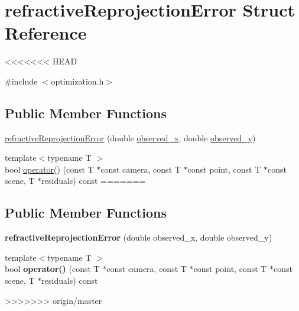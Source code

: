 \hypertarget{structrefractiveReprojectionError}{\section{refractive\-Reprojection\-Error Struct Reference}
\label{d8/d20/structrefractiveReprojectionError}
}
<<<<<<< HEAD


{\ttfamily \#include $<$optimization.\-h$>$}

\subsection*{Public Member Functions}
\begin{DoxyCompactItemize}
\item 
\hyperlink{structrefractiveReprojectionError_a0bd1a52a65545d440518fa718beba32b}{refractive\-Reprojection\-Error} (double \hyperlink{structrefractiveReprojectionError_a7992f6f0be264e8a5f72027ac5897581}{observed\-\_\-x}, double \hyperlink{structrefractiveReprojectionError_aa2f04966bc8045945bee5487a0b6fac7}{observed\-\_\-y})
\item 
{\footnotesize template$<$typename T $>$ }\\bool \hyperlink{structrefractiveReprojectionError_ac25617f3bbdb148e1591a64895c1444c}{operator()} (const T $\ast$const camera, const T $\ast$const point, const T $\ast$const scene, T $\ast$residuals) const 
=======
\subsection*{Public Member Functions}
\begin{DoxyCompactItemize}
\item 
\hypertarget{structrefractiveReprojectionError_a0bd1a52a65545d440518fa718beba32b}{{\bfseries refractive\-Reprojection\-Error} (double observed\-\_\-x, double observed\-\_\-y)}\label{d8/d20/structrefractiveReprojectionError_a0bd1a52a65545d440518fa718beba32b}

\item 
\hypertarget{structrefractiveReprojectionError_ac25617f3bbdb148e1591a64895c1444c}{{\footnotesize template$<$typename T $>$ }\\bool {\bfseries operator()} (const T $\ast$const camera, const T $\ast$const point, const T $\ast$const scene, T $\ast$residuals) const }\label{d8/d20/structrefractiveReprojectionError_ac25617f3bbdb148e1591a64895c1444c}

>>>>>>> origin/master
\end{DoxyCompactItemize}

\end{DoxyCompactItemize}
